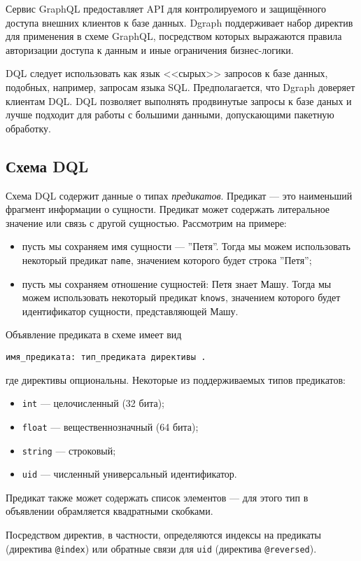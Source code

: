 Сервис GraphQL предоставляет API для контролируемого и защищённого доступа внешних клиентов к базе данных. Dgraph
поддерживает набор директив для применения в схеме GraphQL, посредством которых выражаются правила авторизации доступа
к данным и иные ограничения бизнес-логики.

DQL следует использовать как язык <<сырых>> запросов к базе данных, подобных, например, запросам языка SQL.
Предполагается, что Dgraph доверяет клиентам DQL. DQL позволяет выполнять продвинутые запросы к базе даных и лучше
подходит для работы с большими данными, допускающими пакетную обработку.

\subsection{Схема DQL}

Схема DQL содержит данные о типах \textit{предикатов}. Предикат --- это наименьший фрагмент информации о сущности.
Предикат может содержать литеральное значение или связь с другой сущностью. Рассмотрим на примере:
\begin{itemize}
  \item пусть мы сохраняем имя сущности --- ''Петя''. Тогда мы можем использовать некоторый предикат \texttt{name},
    значением которого будет строка ''Петя'';
  \item пусть мы сохраняем отношение сущностей: Петя знает Машу. Тогда мы можем использовать некоторый предикат
    \texttt{knows}, значением которого будет идентификатор сущности, представляющей Машу.
\end{itemize}

Объявление предиката в схеме имеет вид
\begin{Verbatim}
имя_предиката: тип_предиката директивы .
\end{Verbatim}
где директивы опциональны. Некоторые из поддерживаемых типов предикатов:
\begin{itemize}
    \item \texttt{int} --- целочисленный (32 бита);
    \item \texttt{float} --- вещественнозначный (64 бита);
    \item \texttt{string} --- строковый;
    \item \texttt{uid} --- численный универсальный идентификатор.
\end{itemize}
Предикат также может содержать список элементов --- для этого тип в объявлении обрамляется квадратными скобками.

Посредством директив, в частности, определяются индексы на предикаты (директива \texttt{@index}) или обратные связи
для \texttt{uid} (директива \texttt{@reversed}).

